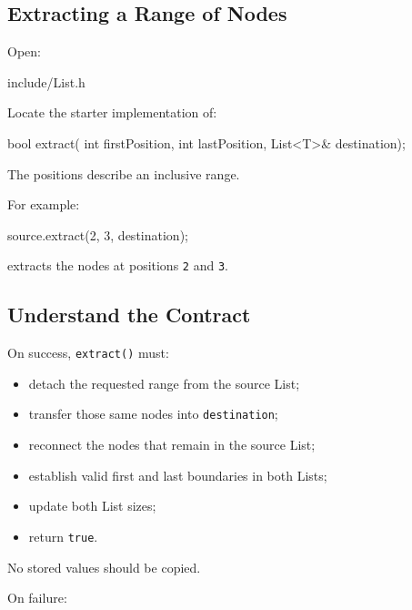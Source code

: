 \documentclass{csc2059practical}
\begin{document}

\subsection{Extracting a Range of Nodes}

Open:

\begin{terminal}
include/List.h
\end{terminal}

Locate the starter implementation of:

\begin{cppcode}
bool extract(
    int firstPosition,
    int lastPosition,
    List<T>& destination);
\end{cppcode}

The positions describe an inclusive range.

For example:

\begin{cppcode}
source.extract(2, 3, destination);
\end{cppcode}

extracts the nodes at positions \texttt{2} and \texttt{3}.


\subsection{Understand the Contract}

On success, \texttt{extract()} must:

\begin{itemize}
    \item detach the requested range from the source List;
    \item transfer those same nodes into \texttt{destination};
    \item reconnect the nodes that remain in the source List;
    \item establish valid first and last boundaries in both Lists;
    \item update both List sizes;
    \item return \texttt{true}.
\end{itemize}

No stored values should be copied.

On failure:
\end{document}
